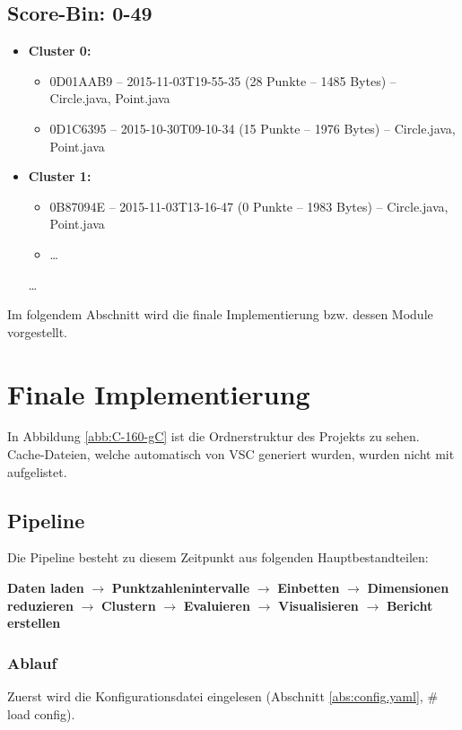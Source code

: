\subsection*{Score-Bin: 0-49}
\begin{itemize}
  \item \textbf{Cluster 0:}
  \begin{itemize}
    \item 0D01AAB9 -- 2015-11-03T19-55-35 (28 Punkte -- 1485 Bytes) -- Circle.java, Point.java
    \item 0D1C6395 -- 2015-10-30T09-10-34 (15 Punkte -- 1976 Bytes) -- Circle.java, Point.java
  \end{itemize}
  \item \textbf{Cluster 1:}
  \begin{itemize}
    \item 0B87094E -- 2015-11-03T13-16-47 (0 Punkte -- 1983 Bytes) -- Circle.java, Point.java
    \item \dots
  \end{itemize}
  \dots
\end{itemize}

Im folgendem Abschnitt wird die finale Implementierung bzw. dessen Module vorgestellt.

\section{Finale Implementierung}
In Abbildung \ref{abb:C-160-gC} ist die Ordnerstruktur des Projekts zu sehen. Cache-Dateien, welche automatisch von VSC generiert wurden, wurden nicht mit aufgelistet.
\subsection{Pipeline}
Die Pipeline besteht zu diesem Zeitpunkt aus folgenden Hauptbestandteilen:

\textbf{Daten laden} $\rightarrow$ \textbf{Punktzahlenintervalle} $\rightarrow$ \textbf{Einbetten} $\rightarrow$ \textbf{Dimensionen reduzieren} $\rightarrow$ \textbf{Clustern} $\rightarrow$ \textbf{Evaluieren} $\rightarrow$ \textbf{Visualisieren} $\rightarrow$ \textbf{Bericht erstellen}

\subsubsection*{Ablauf}
Zuerst wird die Konfigurationsdatei eingelesen (Abschnitt \ref{abs:config.yaml}, \# load config).

